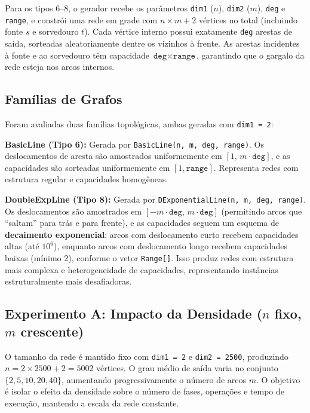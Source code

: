 \documentclass{infufrgs}
\begin{document}
Para os tipos 6–8, o gerador recebe os parâmetros \texttt{dim1} ($n$), \texttt{dim2} ($m$), \texttt{deg} e \texttt{range}, e constrói uma rede em grade com $n \times m + 2$ vértices no total (incluindo fonte $s$ e sorvedouro $t$). Cada vértice interno possui exatamente \texttt{deg} arestas de saída, sorteadas aleatoriamente dentre os vizinhos à frente. As arestas incidentes à fonte e ao sorvedouro têm capacidade $\texttt{deg} \times \texttt{range}$, garantindo que o gargalo da rede esteja nos arcos internos.

\subsection{Famílias de Grafos}

Foram avaliadas duas famílias topológicas, ambas geradas com \texttt{dim1 = 2}:

\textbf{BasicLine (Tipo 6):} Gerada por \texttt{BasicLine(n, m, deg, range)}. Os deslocamentos de aresta são amostrados uniformemente em $[1,\, m \cdot \texttt{deg}]$, e as capacidades são sorteadas uniformemente em $[1, \texttt{range}]$. Representa redes com estrutura regular e capacidades homogêneas.

\textbf{DoubleExpLine (Tipo 8):} Gerada por \texttt{DExponentialLine(n, m, deg, range)}. Os deslocamentos são amostrados em $[-m \cdot \texttt{deg},\, m \cdot \texttt{deg}]$ (permitindo arcos que ``saltam'' para trás e para frente), e as capacidades seguem um esquema de \textbf{decaimento exponencial}: arcos com deslocamento curto recebem capacidades altas (até $10^6$), enquanto arcos com deslocamento longo recebem capacidades baixas (mínimo $2$), conforme o vetor \texttt{Range[]}. Isso produz redes com estrutura mais complexa e heterogeneidade de capacidades, representando instâncias estruturalmente mais desafiadoras.

\subsection{Experimento A: Impacto da Densidade (\texorpdfstring{$n$}{n} fixo, \texorpdfstring{$m$}{m} crescente)}

O tamanho da rede é mantido fixo com \texttt{dim1 = 2} e \texttt{dim2 = 2500}, produzindo $n = 2 \times 2500 + 2 = 5002$ vértices. O grau médio de saída varia no conjunto $\{2, 5, 10, 20, 40\}$, aumentando progressivamente o número de arcos $m$. O objetivo é isolar o efeito da densidade sobre o número de fases, operações e tempo de execução, mantendo a escala da rede constante.
\end{document}
